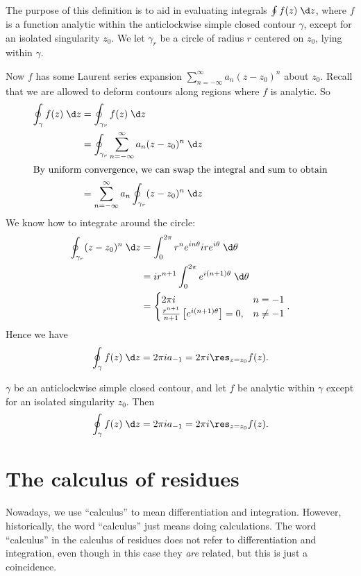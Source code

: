 \documentclass[a4paper]{article}
\begin{document}
The purpose of this definition is to aid in evaluating integrals $\oint f(z)\;\d z$, where $f$ is a function analytic within the anticlockwise simple closed contour $\gamma$, except for an isolated singularity $z_0$. We let $\gamma_r$ be a circle of radius $r$ centered on $z_0$, lying within $\gamma$.
\begin{center}
\end{center}
Now $f$ has some Laurent series expansion $\sum_{n = -\infty}^\infty a_n (z - z_0)^n$ about $z_0$. Recall that we are allowed to deform contours along regions where $f$ is analytic. So
\begin{align*}
  \oint_\gamma f(z)\;\d z &= \oint_{\gamma_r} f(z)\;\d z\\
  &= \oint_{\gamma_r} \sum_{n = -\infty}^\infty a_n (z - z_0)^n \;\d z\\
  \intertext{By uniform convergence, we can swap the integral and sum to obtain}
  &= \sum_{n = -\infty}^\infty a_n \oint_{\gamma_r} (z - z_0)^n \;\d z
\end{align*}
We know how to integrate around the circle:
\begin{align*}
  \oint_{\gamma_r}(z - z_0)^n \;\d z &= \int_0^{2\pi} r^n e^{in \theta} i r e^{i \theta}\;\d \theta\\
  &= ir^{n + 1} \int_0^{2\pi} e^{i(n + 1)\theta}\;\d \theta\\
  &=
  \begin{cases}
    2 \pi i & n = -1\\
    \frac{r^{n + 1}}{n + 1}\left[ e^{i(n + 1)\theta}\right] = 0, &n \not= -1
  \end{cases}.
\end{align*}
Hence we have
\[
  \oint_\gamma f(z)\;\d z = 2\pi i a_{-1} = 2 \pi i \res_{z = z_0}f(z).
\]
\begin{thm}
  $\gamma$ be an anticlockwise simple closed contour, and let $f$ be analytic within $\gamma$ except for an isolated singularity $z_0$. Then
  \[
    \oint_\gamma f(z)\;\d z = 2\pi i a_{-1} = 2 \pi i \res_{z = z_0}f(z).
  \]
\end{thm}

\section{The calculus of residues}
Nowadays, we use ``calculus'' to mean differentiation and integration. However, historically, the word ``calculus'' just means doing calculations. The word ``calculus'' in the calculus of residues does not refer to differentiation and integration, even though in this case they \emph{are} related, but this is just a coincidence.
\end{document}
